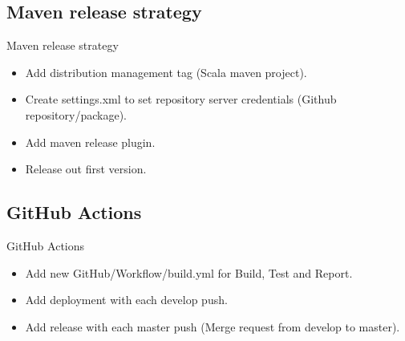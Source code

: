\documentclass[aspectratio=169]{beamer}
\begin{document}
    \subsection{Maven release strategy}\label{subsec:maven-release-strategy}
    \begin{frame}{Maven release strategy}
        \begin{itemize}[<+- | alert@+>]
            \item Add distribution management tag (Scala maven project).
            \item Create settings.xml to set repository server credentials (Github repository/package).
            \item Add maven release plugin.
            \item Release out first version.
        \end{itemize}
    \end{frame}

    \subsection{GitHub Actions}\label{subsec:github-actions}
    \begin{frame}{GitHub Actions}
        \begin{itemize}[<+- | alert@+>]
            \item Add new GitHub/Workflow/build.yml for Build, Test and Report.
            \item Add deployment with each develop push.
            \item Add release with each master push (Merge request from develop to master).
        \end{itemize}
    \end{frame}
\end{document}

